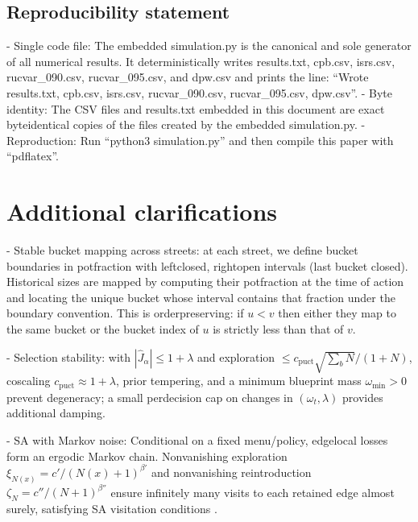 \subsection*{Reproducibility statement}
- Single code file: The embedded simulation.py is the canonical and sole generator of all numerical results. It deterministically writes results.txt, cpb.csv, isrs.csv, rucvar\_090.csv, rucvar\_095.csv, and dpw.csv and prints the line: “Wrote results.txt, cpb.csv, isrs.csv, rucvar\_090.csv, rucvar\_095.csv, dpw.csv”.
- Byte identity: The CSV files and results.txt embedded in this document are exact byte\textendash identical copies of the files created by the embedded simulation.py.
- Reproduction: Run “python3 simulation.py” and then compile this paper with “pdflatex”.

\begin{adjustbox}{width=\linewidth}
\begin{minipage}{\linewidth}
\small

\end{minipage}
\end{adjustbox}

\section{Additional clarifications}
- Stable bucket mapping across streets: at each street, we define bucket boundaries in pot\textendash fraction with left\textendash closed, right\textendash open intervals (last bucket closed). Historical sizes are mapped by computing their pot\textendash fraction at the time of action and locating the unique bucket whose interval contains that fraction under the boundary convention. This is order\textendash preserving: if $u<v$ then either they map to the same bucket or the bucket index of $u$ is strictly less than that of $v$.

- Selection stability: with $|\widehat{J}_\alpha|\le 1+\lambda$ and exploration $\le c_{\text{puct}}\sqrt{\sum_b N}/(1+N)$, co\textendash scaling $c_{\text{puct}}\approx 1+\lambda$, prior tempering, and a minimum blueprint mass $\omega_{\min}>0$ prevent degeneracy; a small per\textendash decision cap on changes in $(\omega_t,\lambda)$ provides additional damping.

- SA with Markov noise: Conditional on a fixed menu/policy, edge\textendash local losses form an ergodic Markov chain. Nonvanishing exploration $\xi_{N(x)}=c'/(N(x)+1)^{\beta'}$ and nonvanishing reintroduction $\zeta_N=c''/(N+1)^{\beta''}$ ensure infinitely many visits to each retained edge almost surely, satisfying SA visitation conditions \cite{borkar2008sa}.

